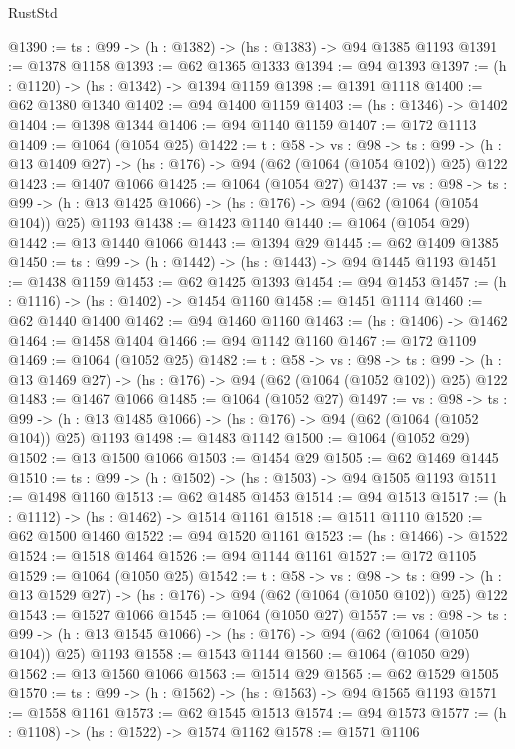 \begin{lexlean}{RustStd}
\begin{coremodule}
@1390 := {ts : @99} -> (h : @1382) -> (hs : @1383) -> @94 @1385 @1193
@1391 := @1378 @1158
@1393 := @62 @1365 @1333
@1394 := @94 @1393
@1397 := (h : @1120) -> (hs : @1342) -> @1394 @1159
@1398 := @1391 @1118
@1400 := @62 @1380 @1340
@1402 := @94 @1400 @1159
@1403 := (hs : @1346) -> @1402
@1404 := @1398 @1344
@1406 := @94 @1140 @1159
@1407 := @172 @1113
@1409 := @1064 (@1054 @25)
@1422 := {t : @58} ->
  {vs : @98} ->
  {ts : @99} -> (h : @13 @1409 @27) -> (hs : @176) -> @94 (@62 (@1064 (@1054 @102)) @25) @122
@1423 := @1407 @1066
@1425 := @1064 (@1054 @27)
@1437 := {vs : @98} ->
  {ts : @99} -> (h : @13 @1425 @1066) -> (hs : @176) -> @94 (@62 (@1064 (@1054 @104)) @25) @1193
@1438 := @1423 @1140
@1440 := @1064 (@1054 @29)
@1442 := @13 @1440 @1066
@1443 := @1394 @29
@1445 := @62 @1409 @1385
@1450 := {ts : @99} -> (h : @1442) -> (hs : @1443) -> @94 @1445 @1193
@1451 := @1438 @1159
@1453 := @62 @1425 @1393
@1454 := @94 @1453
@1457 := (h : @1116) -> (hs : @1402) -> @1454 @1160
@1458 := @1451 @1114
@1460 := @62 @1440 @1400
@1462 := @94 @1460 @1160
@1463 := (hs : @1406) -> @1462
@1464 := @1458 @1404
@1466 := @94 @1142 @1160
@1467 := @172 @1109
@1469 := @1064 (@1052 @25)
@1482 := {t : @58} ->
  {vs : @98} ->
  {ts : @99} -> (h : @13 @1469 @27) -> (hs : @176) -> @94 (@62 (@1064 (@1052 @102)) @25) @122
@1483 := @1467 @1066
@1485 := @1064 (@1052 @27)
@1497 := {vs : @98} ->
  {ts : @99} -> (h : @13 @1485 @1066) -> (hs : @176) -> @94 (@62 (@1064 (@1052 @104)) @25) @1193
@1498 := @1483 @1142
@1500 := @1064 (@1052 @29)
@1502 := @13 @1500 @1066
@1503 := @1454 @29
@1505 := @62 @1469 @1445
@1510 := {ts : @99} -> (h : @1502) -> (hs : @1503) -> @94 @1505 @1193
@1511 := @1498 @1160
@1513 := @62 @1485 @1453
@1514 := @94 @1513
@1517 := (h : @1112) -> (hs : @1462) -> @1514 @1161
@1518 := @1511 @1110
@1520 := @62 @1500 @1460
@1522 := @94 @1520 @1161
@1523 := (hs : @1466) -> @1522
@1524 := @1518 @1464
@1526 := @94 @1144 @1161
@1527 := @172 @1105
@1529 := @1064 (@1050 @25)
@1542 := {t : @58} ->
  {vs : @98} ->
  {ts : @99} -> (h : @13 @1529 @27) -> (hs : @176) -> @94 (@62 (@1064 (@1050 @102)) @25) @122
@1543 := @1527 @1066
@1545 := @1064 (@1050 @27)
@1557 := {vs : @98} ->
  {ts : @99} -> (h : @13 @1545 @1066) -> (hs : @176) -> @94 (@62 (@1064 (@1050 @104)) @25) @1193
@1558 := @1543 @1144
@1560 := @1064 (@1050 @29)
@1562 := @13 @1560 @1066
@1563 := @1514 @29
@1565 := @62 @1529 @1505
@1570 := {ts : @99} -> (h : @1562) -> (hs : @1563) -> @94 @1565 @1193
@1571 := @1558 @1161
@1573 := @62 @1545 @1513
@1574 := @94 @1573
@1577 := (h : @1108) -> (hs : @1522) -> @1574 @1162
@1578 := @1571 @1106

\end{coremodule}
\end{lexlean}
